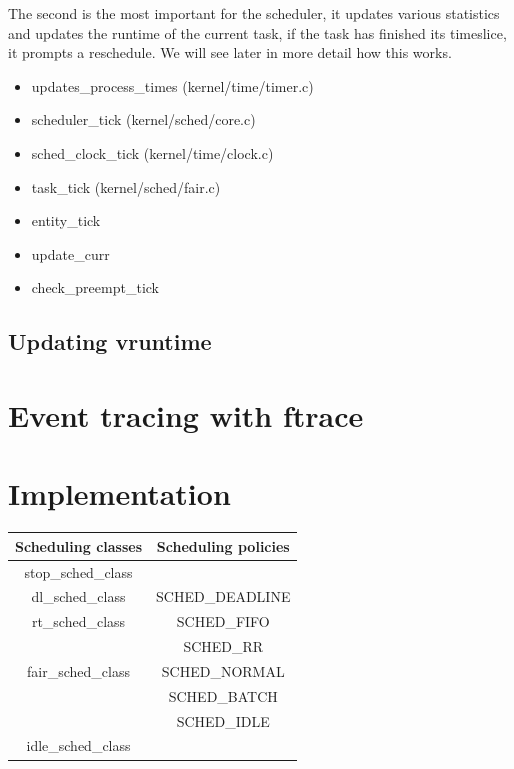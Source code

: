 \documentclass[10pt]{book}
\begin{document}
The second is the most important for the scheduler, it updates various statistics and updates the runtime of the current task, if the task has finished its timeslice, it prompts a reschedule. We will see later in more detail how this works. %
\begin{itemize} %
\item updates\_process\_times (kernel/time/timer.c)
\item scheduler\_tick (kernel/sched/core.c)
\item sched\_clock\_tick (kernel/time/clock.c)
\item task\_tick (kernel/sched/fair.c)
\item entity\_tick 
\item update\_curr
\item check\_preempt\_tick
\end{itemize}

\section{Updating vruntime}



\chapter{Event tracing with ftrace} %
\label{chap:ftrace}


\chapter{Implementation}
\label{chap:implementation}
\begin{tabular}{|c|c|}
\hline
\textbf{Scheduling classes} & \textbf{Scheduling policies}\\
\hline
stop\_sched\_class &\\
\hline
dl\_sched\_class   & SCHED\_DEADLINE\\
\hline
rt\_sched\_class   & SCHED\_FIFO \\
                   		   & SCHED\_RR\\
\hline
fair\_sched\_class & SCHED\_NORMAL\\
                   & SCHED\_BATCH\\
                   & SCHED\_IDLE\\
\hline
idle\_sched\_class &\\          
\hline
\end{tabular}
\end{document}
